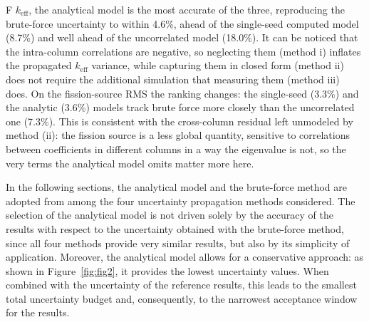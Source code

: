 \documentclass{style/nseJournal}
\begin{document}
F $k_{\text{eff}}$, the analytical model is the most accurate of the three, reproducing the brute-force uncertainty to within 4.6\%, ahead of the single-seed computed model (8.7\%) and well ahead of the uncorrelated model (18.0\%). It can be noticed that the intra-column correlations are negative, so neglecting them (method i) inflates the propagated $k_{\text{eff}}$ variance, while capturing them in closed form (method ii) does not require the additional simulation that measuring them (method iii) does. On the fission-source RMS the ranking changes: the single-seed (3.3\%) and the analytic (3.6\%) models track brute force more closely than the uncorrelated one (7.3\%). This is consistent with the cross-column residual left unmodeled by method (ii): the fission source is a less global quantity, sensitive to correlations between coefficients in different columns in a way the eigenvalue is not, so the very terms the analytical model omits matter more here.

In the following sections, the analytical model and the brute-force method are adopted from among the four uncertainty propagation methods considered. The selection of the analytical model is not driven solely by the accuracy of the results with respect to the uncertainty obtained with the brute-force method, since all four methods provide very similar results, but also by its simplicity of application. Moreover, the analytical model allows for a conservative approach: as shown in Figure~\ref{fig:fig2}, it provides the lowest uncertainty values. When combined with the uncertainty of the reference results, this leads to the smallest total uncertainty budget and, consequently, to the narrowest acceptance window for the results.





\end{document}
